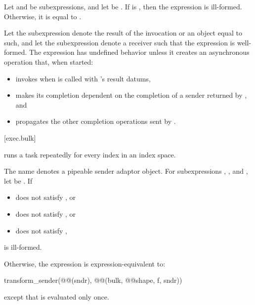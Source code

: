 \pnum
Let  and  be subexpressions, and
let  be .
If
is ,
then the expression 
is ill-formed.
Otherwise, it is equal to
.

\pnum
Let the subexpression  denote
the result of the invocation  or
an object equal to such, and
let the subexpression  denote a receiver
such that the expression  is well-formed.
The expression  has undefined behavior
unless it creates an asynchronous operation that,
when started:
\begin{itemize}
\item
invokes  when  is called
with 's result datums,
\item
makes its completion dependent on
the completion of a sender returned by , and
\item
propagates the other completion operations sent by .
\end{itemize}

[exec.bulk]{}

\pnum
{} runs a task repeatedly for every index in an index space.

The name  denotes a pipeable sender adaptor object.
For subexpressions , , and ,
let  be .
If
\begin{itemize}
\item
{} does not satisfy , or
\item
{} does not satisfy , or
\item
{} does not satisfy ,
\end{itemize}
 is ill-formed.

\pnum
Otherwise,
the expression  is expression-equivalent to:

\begin{codeblock}
transform_sender(@@(sndr), @@(bulk, @@{shape, f}, sndr))
\end{codeblock}
except that  is evaluated only once.

